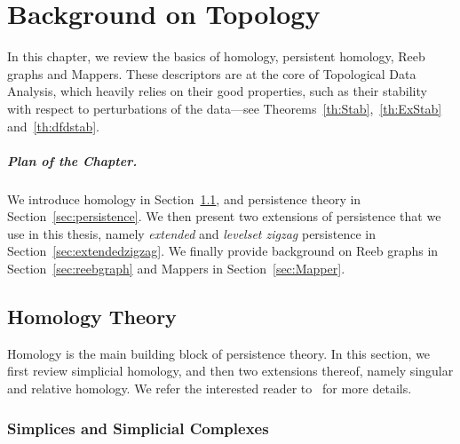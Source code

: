 \chapter{Background on Topology}
\label{chap:backgroundHomologyPersistence}

In this chapter, we review the basics of homology, persistent homology, Reeb graphs and Mappers.
These descriptors are 
at the core of Topological Data Analysis, which 
heavily relies on their good properties, %
such as their stability with respect to perturbations
of the data---see Theorems~\ref{th:Stab},~\ref{th:ExStab} and~\ref{th:dfdstab}.

\paragraph*{Plan of the Chapter.} We introduce homology in Section~\ref{sec:homology},
and persistence theory in Section~\ref{sec:persistence}. We then present two extensions
of persistence that we use in this thesis, namely {\em extended} and {\em levelset zigzag}
persistence in Section~\ref{sec:extendedzigzag}. We finally provide background on Reeb graphs
in Section~\ref{sec:reebgraph} and Mappers in Section~\ref{sec:Mapper}. 



\section{Homology Theory}
\label{sec:homology}  

Homology is the main building block of persistence theory. In this section, we
first review simplicial homology, and then two extensions thereof, namely
singular and relative homology. %
We refer the interested reader to~\cite{Munkres93} for more details.

\subsection{Simplices and Simplicial Complexes}
\label{sec:simplex}

